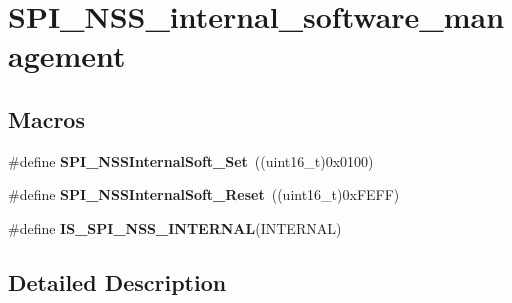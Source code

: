 \hypertarget{group___s_p_i___n_s_s__internal__software__management}{\section{S\-P\-I\-\_\-\-N\-S\-S\-\_\-internal\-\_\-software\-\_\-management}
\label{group___s_p_i___n_s_s__internal__software__management}
}
\subsection*{Macros}
\begin{DoxyCompactItemize}
\item 
\hypertarget{group___s_p_i___n_s_s__internal__software__management_ga6b2102816167d12140648dba49a192a7}{\#define {\bfseries S\-P\-I\-\_\-\-N\-S\-S\-Internal\-Soft\-\_\-\-Set}~((uint16\-\_\-t)0x0100)}\label{group___s_p_i___n_s_s__internal__software__management_ga6b2102816167d12140648dba49a192a7}

\item 
\hypertarget{group___s_p_i___n_s_s__internal__software__management_ga292ec7bc0cd362d61b3b5eed620522c2}{\#define {\bfseries S\-P\-I\-\_\-\-N\-S\-S\-Internal\-Soft\-\_\-\-Reset}~((uint16\-\_\-t)0x\-F\-E\-F\-F)}\label{group___s_p_i___n_s_s__internal__software__management_ga292ec7bc0cd362d61b3b5eed620522c2}

\item 
\#define {\bfseries I\-S\-\_\-\-S\-P\-I\-\_\-\-N\-S\-S\-\_\-\-I\-N\-T\-E\-R\-N\-A\-L}(I\-N\-T\-E\-R\-N\-A\-L)
\end{DoxyCompactItemize}


\subsection{Detailed Description}


